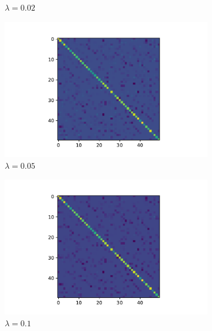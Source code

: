 \documentclass{article}
\begin{document}
\begin{figure}[htb]
\begin{subfigure}[t]{0.32\linewidth}
        \caption{$\lambda = 0.02$}
    \end{subfigure}\hfill
    \begin{subfigure}[t]{0.32\linewidth}
        \centering
        \includegraphics[width=\textwidth]{imagenes/graphical_lasso/graphical_lasso_alpha_0_05.pdf}
        \caption{$\lambda = 0.05$}
    \end{subfigure}
    \begin{subfigure}[t]{0.32\linewidth}
        \centering
        \includegraphics[width=\textwidth]{imagenes/graphical_lasso/graphical_lasso_alpha_0_1.pdf}
        \caption{$\lambda = 0.1$}
    \end{subfigure}
    \begin{subfigure}[t]{0.32\linewidth}
        \centering

\end{subfigure}
\end{figure}
\end{document}
